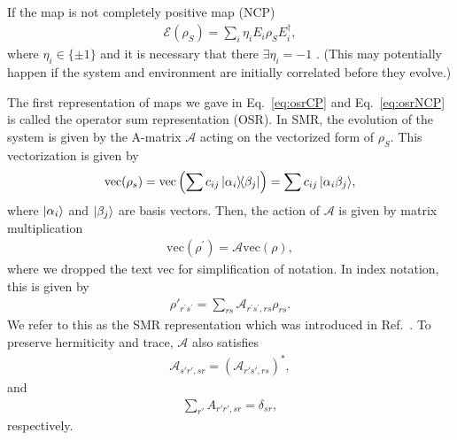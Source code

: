 \documentclass[12pt]{iopart}
\begin{document}
If the map is not completely positive map (NCP)
\begin{align}\label{eq:osrNCP}
    \mathcal{E}(\rho_S) = \sum_i \eta_iE_i\rho_S E_i^\dagger,
\end{align}
where $\eta_i\in\{\pm 1\}$ and it is necessary that there $\exists \eta_i=-1$ \cite{Choi_1975, Pechukas_1994, Alicki_1995, Pechukas_1995, Jordan_Shaji_Sudarshan_2004, Shaji_Sudarshan_2005}.  (This may potentially happen if the system and environment are initially correlated before they evolve.)  

The first representation of maps we gave in Eq.~\eqref{eq:osrCP} and Eq.~\eqref{eq:osrNCP} is called the operator sum representation (OSR).  In SMR, the evolution of the system is given by the A-matrix $\mathcal{A}$ acting on the vectorized form of $\rho_S$. This vectorization is given by
\begin{align}
    \text{vec}(\rho_s)=\text{vec}\left(\sum{c_{ij}\op{\alpha_i}{\beta_j}}\right)=\sum{c_{ij}\ket{\alpha_i\beta_j}},
\end{align}
where $\ket{\alpha_i}$ and $\ket{\beta_j}$ are basis vectors. Then, the action of $\mathcal{A}$ is given by matrix multiplication
\begin{align}
    \text{vec}(\rho^\prime) = \mathcal{A}\text{vec}(\rho),
\end{align}
where we dropped the text vec for simplification of notation. In index notation, this is given by \cite{sudarshan_1961}
\begin{align}\label{eq:smr_def}
    \rho'_{r^\prime s^\prime} = \sum_{rs}\mathcal{A}_{r^\prime s^\prime,rs}\rho_{rs}.
\end{align}
We refer to this as the SMR representation which was introduced in Ref.~\cite{sudarshan_1961}.  To preserve hermiticity and trace, $\mathcal{A}$ also satisfies
\begin{align}
    \mathcal{A}_{s'r',sr}=(\mathcal{A}_{r's',rs})^*,
\end{align}
and
\begin{align}
    \sum_{r'} A_{r'r',sr} = \delta_{sr},
\end{align}
respectively.
\end{document}
